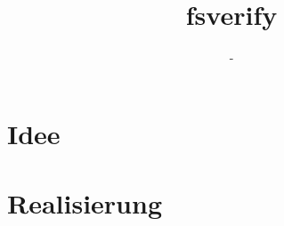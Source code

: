 \documentclass[12pt,a4paper]{article}
\title{fsverify}
\author{-}
\begin{document}

\clearpage
\newpage
\tableofcontents
{}
\newpage
\section{Idee}

\section{Realisierung}

\end{document}
